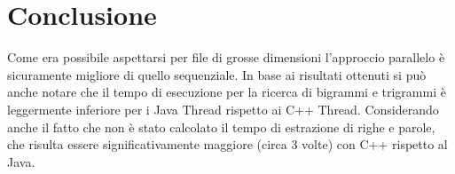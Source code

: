 \documentclass[10pt,twocolumn,letterpaper]{article}
\begin{document}
\section{Conclusione}
Come era possibile aspettarsi per file di grosse dimensioni l'approccio parallelo è sicuramente migliore di quello sequenziale.\newline
In base ai risultati ottenuti si può anche notare che il tempo di esecuzione per la ricerca di bigrammi e trigrammi è leggermente inferiore per i Java Thread rispetto ai C++ Thread.
Considerando anche il fatto che non è stato calcolato il tempo di estrazione di righe e parole, che risulta essere significativamente maggiore (circa 3 volte) con C++ rispetto al Java.

{


}
\end{document}
